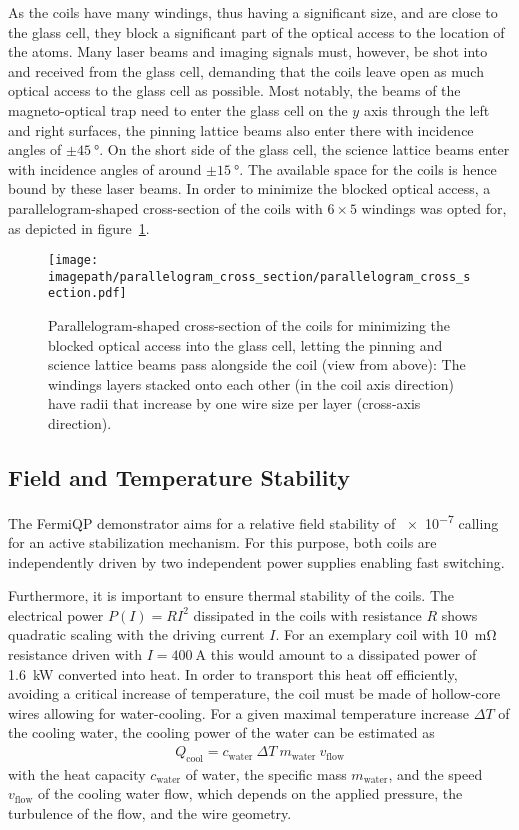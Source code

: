 As the coils have many windings, thus having a significant size, and are close to the glass cell, they block a significant part of the optical access to the location of the atoms. Many laser beams and imaging signals must, however, be shot into and received from the glass cell, demanding that the coils leave open as much optical access to the glass cell as possible. Most notably, the beams of the magneto-optical trap need to enter the glass cell on the $y$ axis through the left and right surfaces, the pinning lattice beams also enter there with incidence angles of $\pm \SI{45}{\degree}$. On the short side of the glass cell, the science lattice beams enter with incidence angles of around $\pm \SI{15}{\degree}$. The available space for the coils is hence bound by these laser beams. In order to minimize the blocked optical access, a parallelogram-shaped cross-section of the coils with $6 \times 5$ windings was opted for, as depicted in figure~\ref{fig:parallelogram_cross_section}.
\begin{figure}
    \centering
    \texttt{[image: \\imagepath/parallelogram\_cross\_section/parallelogram\_cross\_section.pdf]}
    \caption{Parallelogram-shaped cross-section of the coils for minimizing the blocked optical access into the glass cell, letting the pinning and science lattice beams pass alongside the coil (view from above): The windings layers stacked onto each other (in the coil axis direction) have radii that increase by one wire size per layer (cross-axis direction).}
    \label{fig:parallelogram_cross_section}
\end{figure}


\subsection*{Field and Temperature Stability}
The FermiQP demonstrator aims for a relative field stability of \SI{e-7}{} calling for an active stabilization mechanism. For this purpose, both coils are independently driven by two independent power supplies enabling fast switching.

Furthermore, it is important to ensure thermal stability of the coils. The electrical power $P(I) = RI^2$ dissipated in the coils with resistance $R$ shows quadratic scaling  with the driving current $I$. For an exemplary coil with \SI{10}{\milli\ohm} resistance driven with $I = \SI{400}{\ampere}$ this would amount to a dissipated power of \SI{1.6}{\kilo\watt} converted into heat. In order to transport this heat off efficiently, avoiding a critical increase of temperature, the coil must be made of hollow-core wires allowing for water-cooling. For a given maximal temperature increase $\Delta T$ of the cooling water, the cooling power of the water can be estimated as
\begin{align}
    Q_\text{cool} = c_\text{water} ~ \Delta T ~ m_\text{water} ~ v_\text{flow}
\end{align}
with the heat capacity $ c_\text{water}$ of water, the specific mass $m_\text{water}$, and the speed $v_\text{flow}$ of the cooling water flow, which depends on the applied pressure, the turbulence of the flow, and the wire geometry.

